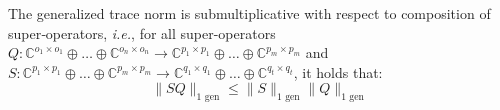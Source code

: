 \begin{proposition}\label{lem:gen_trace_submultiplicative}
  The generalized trace norm is submultiplicative with respect to composition of super‑operators, \textit{i.e.}, for all super-operators $Q: \mathbb{C}^{o_1 \times o_1} \oplus \ldots \oplus \mathbb{C}^{o_n \times o_n}  \rightarrow \mathbb{C}^{p_1 \times p_1} \oplus \ldots \oplus  \mathbb{C}^{p_m \times p_m}$ and $S: \mathbb{C}^{p_1 \times p_1} \oplus \ldots \oplus \mathbb{C}^{p_m \times p_m}  \rightarrow \mathbb{C}^{q_1 \times q_1} \oplus \ldots \oplus \mathbb{C}^{q_t \times q_t}$, it holds that:
  \begin{equation} \label{eq:gen_trace_submultiplicative}
    \lVert S  Q \rVert_{1 \text{ gen}} \leq \lVert S \rVert_{1 \text{ gen}} \lVert Q \rVert_{1 \text{ gen}}
  \end{equation}
\end{proposition}

